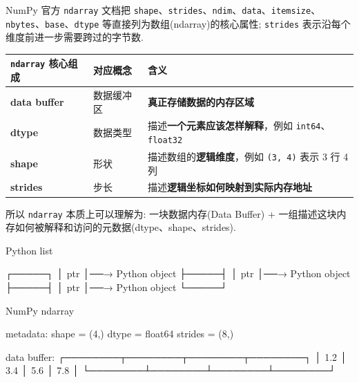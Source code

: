 \documentclass[11pt]{article}
\newenvironment{Shaded}{}{}
\newcommand{\NormalTok}[1]{{#1}}
\begin{document}
NumPy 官方 \texttt{ndarray} 文档把
\texttt{shape}、\texttt{strides}、\texttt{ndim}、\texttt{data}、\texttt{itemsize}、\texttt{nbytes}、\texttt{base}、\texttt{dtype}
等直接列为数组(ndarray)的核心属性; \texttt{strides}
表示沿每个维度前进一步需要跨过的字节数.

{\def\LTcaptype{none} %
\begin{longtable}[]{@{}
  >{\centering\arraybackslash}p{}
  >{\centering\arraybackslash}p{}
  >{\centering\arraybackslash}p{}@{}}
\toprule\noalign{}
\begin{minipage}[b]{\linewidth}\centering
\texttt{ndarray} 核心组成
\end{minipage} & \begin{minipage}[b]{\linewidth}\centering
对应概念
\end{minipage} & \begin{minipage}[b]{\linewidth}\centering
含义
\end{minipage} \\
\midrule\noalign{}
\endhead
\bottomrule\noalign{}
\endlastfoot
\textbf{data buffer} & 数据缓冲区 & \textbf{真正存储数据的内存区域} \\
\textbf{dtype} & 数据类型 & 描述\textbf{一个元素应该怎样解释}，例如
\texttt{int64}、\texttt{float32} \\
\textbf{shape} & 形状 & 描述数组的\textbf{逻辑维度}，例如
\texttt{(3,\ 4)} 表示 3 行 4 列 \\
\textbf{strides} & 步长 & 描述\textbf{逻辑坐标如何映射到实际内存地址} \\
\end{longtable}
}

所以 \texttt{ndarray} 本质上可以理解为: 一块数据内存(Data Buffer) +
一组描述这块内存如何被解释和访问的元数据(dtype、shape、strides).

\begin{Shaded}
\begin{Highlighting}[]
\NormalTok{Python list}

\NormalTok{┌─────┐}
\NormalTok{│ ptr │──→ Python object}
\NormalTok{├─────┤}
\NormalTok{│ ptr │──→ Python object}
\NormalTok{├─────┤}
\NormalTok{│ ptr │──→ Python object}
\NormalTok{└─────┘}

\NormalTok{NumPy ndarray}

\NormalTok{metadata:}
\NormalTok{shape   = (4,)}
\NormalTok{dtype   = float64}
\NormalTok{strides = (8,)}

\NormalTok{data buffer:}
\NormalTok{┌────────┬────────┬────────┬────────┐}
\NormalTok{│ 1.2    │ 3.4    │ 5.6    │ 7.8    │}
\NormalTok{└────────┴────────┴────────┴────────┘}
\end{Highlighting}
\end{Shaded}
\end{document}
